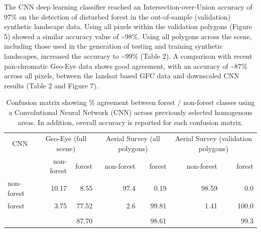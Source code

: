 \documentclass[remote sensing,article,submit,moreauthors,pdftex]{mdpi}
\begin{document}
The CNN deep learning classifier reached an Intersection-over-Union
accuracy of 97\% on the detection of disturbed forest in the
out-of-sample (validation) synthetic landscape data. Using all pixels
within the validation polygons (Figure 5) showed a similar accuracy
value of \textasciitilde{}98\%. Using all polygons across the scene,
including those used in the generation of testing and training synthetic
landscapes, increased the accuracy to \textasciitilde{}99\% (Table 2). A
comparison with recent pan-chromatic Geo-Eye data shows good agreement,
with an accuracy of \textasciitilde{}87\% across all pixels, between the
landsat based GFC data and downscaled CNN results (Table 2 and Figure
7).

\begin{table}[!h]

\caption{\label{tab:unnamed-chunk-7}Confusion matrix showing \% agreement between forest / non-forest classes using a Convolutional Neural Network (CNN) across previously selected homogenous areas. In addition, overall accuracy is reported for each confusion matrix.}
\centering
\begin{tabular}[t]{lrrrrrr}
\toprule
\multicolumn{1}{c}{CNN} & \multicolumn{2}{c}{Geo-Eye (full scene)} & \multicolumn{2}{c}{Aerial Survey (all polygons)} & \multicolumn{2}{c}{Aerial Survey (validation polygons)} \\
\cmidrule(l{3pt}r{3pt}){1-1} \cmidrule(l{3pt}r{3pt}){2-3} \cmidrule(l{3pt}r{3pt}){4-5} \cmidrule(l{3pt}r{3pt}){6-7}
  & non-forest & forest & non-forest & forest & non-forest & forest\\
\midrule
non-forest & 10.17 & 8.55 & 97.4 & 0.19 & 98.59 & 0.0\\
forest & 3.75 & 77.52 & 2.6 & 99.81 & 1.41 & 100.0\\
\addlinespace[0.3em]
\multicolumn{7}{l}{\textbf{Accuracy}}\\
\hspace{1em} &  & 87.70 &  & 98.61 &  & 99.3\\
\bottomrule
\end{tabular}
\end{table}
\end{document}

